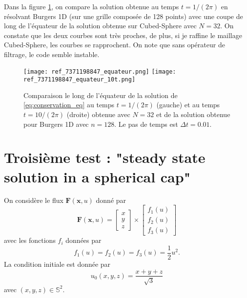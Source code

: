 \documentclass[10pt,a4paper]{article}
\begin{document}
Dans la figure \ref{fig:burgers}, on compare la solution obtenue au temps $t=1/(2 \pi)$ en résolvant Burgers 1D (sur une grille composée de 128 points) avec une coupe de long de l'équateur de la solution obtenue sur Cubed-Sphere avec $N=32$.
On constate que les deux courbes sont très proches, de plus, si je raffine le maillage Cubed-Sphere, les courbes se rapprochent. On note que sans opérateur de filtrage, le code semble instable.

\begin{figure}
\begin{center}
\texttt{[image: ref\_7371198847\_equateur.png]}
\texttt{[image: ref\_7371198847\_equateur\_10t.png]}
\caption{Comparaison le long de l'équateur de la solution de \eqref{eq:conservation_eq} au temps $t=1/(2 \pi)$ (gauche) et au temps $t=10/(2 \pi)$ (droite)  obtenue avec $N=32$ et de la solution obtenue pour Burgers 1D avec $n=128$. Le pas de temps est $\Delta t = 0.01$.}
\end{center}
\label{fig:burgers}
\end{figure}





























\section{Troisième test : "steady state solution in a spherical cap"}

On considère le flux $\mathbf{F}(\mathbf{x},u)$ donné par
\begin{equation}
\mathbf{F}(\mathbf{x},u) = 
\begin{bmatrix}
x \\ y \\ z 
\end{bmatrix} \times
\begin{bmatrix}
f_1(u) \\ f_2(u) \\ f_3(u) 
\end{bmatrix}
\end{equation}
avec les fonctions $f_i$ données par
\begin{equation}
f_1(u) = f_2(u) = f_3(u) = \dfrac{1}{2}u^2.
\end{equation}
La condition initiale est donnée par
\begin{equation}
u_0(x,y,z) = \dfrac{x+y+z}{\sqrt{3}}
\end{equation}
avec $(x,y,z) \in \mathbb{S}^2$.
\end{document}
